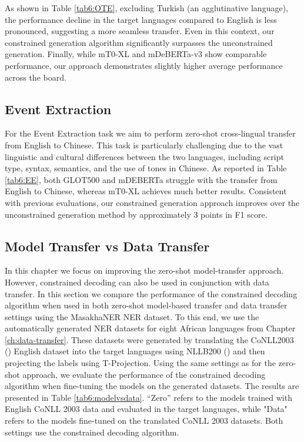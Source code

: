 As shown in Table \ref{tab6:OTE}, excluding Turkish (an agglutinative language), the performance decline in the target languages compared to English is less pronounced, suggesting a more seamless transfer. Even in this context, our constrained generation algorithm significantly surpasses the unconstrained generation. Finally, while mT0-XL and mDeBERTa-v3 show comparable performance, our approach demonstrates slightly higher average performance across the board.


\subsection{Event Extraction}
\label{sc6:ee}



For the Event Extraction task we aim to perform zero-shot cross-lingual transfer from English to Chinese. This task is particularly challenging due to the vast linguistic and cultural differences between the two languages, including script type, syntax, semantics, and the use of tones in Chinese. As reported in Table \ref{tab6:EE}, both GLOT500 and mDEBERTa struggle with the transfer from English to Chinese, whereas mT0-XL achieves much better results. Consistent with previous evaluations, our constrained generation approach improves over the unconstrained generation method by approximately 3 points in F1 score.

\subsection{Model Transfer vs Data Transfer}
\label{sc6:transfer}

In this chapter we focus on improving the zero-shot model-transfer approach. However, constrained decoding can also be used in conjunction with data transfer. In this section we compare the performance of the constrained decoding algorithm when used in both zero-shot model-based transfer and data transfer settings using the MasakhaNER NER dataset. To this end, we use the automatically generated NER datasets for eight African languages from Chapter \ref{ch:data-transfer}. These datasets were generated by translating the CoNLL2003 (\cite{DBLP:conf/conll/SangM03}) English dataset into the target languages using NLLB200 (\cite{DBLP:journals/corr/abs-2207-04672}) and then projecting the labels using T-Projection. Using the same settings as for the zero-shot approach, we evaluate the performance of the constrained decoding algorithm when fine-tuning the models on the generated datasets. The results are presented in Table \ref{tab6:modelvsdata}. ``Zero'' refers to the models trained with English CoNLL 2003 data and evaluated in the target languages, while "Data" refers to the models fine-tuned on the translated CoNLL 2003 datasets. Both settings use the constrained decoding algorithm.

